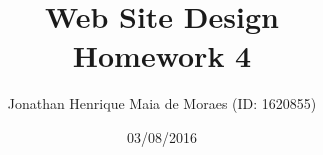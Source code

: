 \title{Web Site Design \\ Homework 4}
\author{Jonathan Henrique Maia de Moraes (ID: 1620855)}
\date{03/08/2016}
\maketitle
